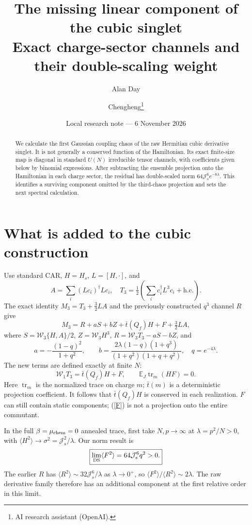 \documentclass[11pt,a4paper]{article}
\title{The missing linear component of the cubic singlet\\Exact charge-sector channels and their double-scaling weight}
\author{Alan Day \and Chengheng\thanks{AI research assistant (OpenAI).}}
\date{Local research note --- 6 November 2026}
\newcommand{\Js}{\mathcal J_s}
\newcommand{\av}[1]{\langle #1\rangle}
\newcommand{\W}{\mathcal W}
\begin{document}
\maketitle
\begin{abstract}
We calculate the first Gaussian coupling chaos of the raw Hermitian
cubic derivative singlet. It is not generally a conserved function
of the Hamiltonian. Its exact finite-size map is diagonal in
standard $U(N)$ irreducible tensor channels, with coefficients
given below by binomial expressions. After subtracting the
ensemble projection onto the Hamiltonian in each charge sector,
the residual has double-scaled norm
$64\mathcal J_s^6 e^{-8\lambda}$. This identifies a surviving
component omitted by the third-chaos projection and sets the
next spectral calculation.
\end{abstract}
\section{What is added to the cubic construction}
Use standard CAR, $H=H_s$, $L=[H,\cdot]$, and
\[
 A=\sum_i(Lc_i)^\dagger Lc_i,\quad
 T_3=\tfrac12\left(\sum_i c_i^\dagger L^3c_i+\mathrm{h.c.}\right).
\]
The exact identity $M_3=T_3+\tfrac32LA$ and the previously
constructed $q^3$ channel $R$ give
\begin{equation}
 \boxed{M_3=R+aS+bZ+\bar t(Q_f)H+F+\tfrac32LA,}       \label{decomp}
\end{equation}
where $S=\W_3\{H,A\}/2$, $Z=\W_3H^3$,
$R=\W_3T_3-aS-bZ$, and
\[
 a=-\frac{(1-q)^2}{1+q^2},\qquad
 b=\frac{2\lambda(1-q)(1+q^3)}{(1+q^2)(1+q+q^2)},
 \quad q=e^{-4\lambda}.
\]
The new terms are defined exactly at finite $N$:
\begin{equation}
 \W_1T_3=\bar t(Q_f)H+F,\qquad
 \mathbb E_J\operatorname{tr}_m(HF)=0.                \label{F}
\end{equation}
Here $\operatorname{tr}_m$ is the normalized trace on charge $m$;
$\bar t(m)$ is a deterministic projection coefficient.
It follows that $\bar t(Q_f)H$ is conserved in each realization.
$F$ can still contain static components; (\ref{F}) is not a
projection onto the entire commutant.

In the full $\beta=\mu_{\rm chem}=0$ annealed trace, first take
$N,p\to\infty$ at $\lambda=p^2/N>0$, with
$\av{H^2}\to\sigma^2=\Js^2/\lambda$. Our norm result is
\begin{equation}
 \boxed{\lim_{\rm DS}\av{F^2}=64\Js^6q^2>0.}         \label{norm}
\end{equation}
The earlier $R$ has $\av{R^2}\sim32\Js^6/\lambda$ as
$\lambda\to0^+$, so $\av{F^2}/\av{R^2}\sim2\lambda$.
The raw derivative family therefore has an additional component
at the first relative order in this limit.
\end{document}
